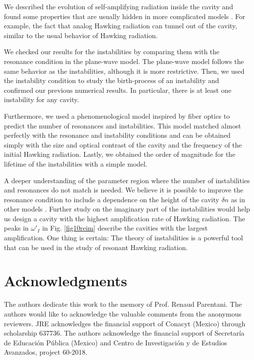 \documentclass[aps,pra,reprint,amsmath,amssymb,showpacs,groupedaddress,floatfix]{revtex4-1}
\begin{document}
We described the evolution of self-amplifying radiation inside the cavity and found some properties that are usually hidden in more complicated models \cite{GaonaReyes2017,Faccio2012}. For example, the fact that analog Hawking radiation can tunnel out of the cavity, similar to the usual behavior of Hawking radiation.

We checked our results for the instabilities by comparing them with the resonance condition in the plane-wave model. The plane-wave model follows the same behavior as the instabilities, although it is more restrictive. Then, we used the instability condition to study the birth-process of an instability and confirmed our previous numerical results. In particular, there is at least one instability for any cavity.

Furthermore, we used a phenomenological model inspired by fiber optics to predict the number of resonances and instabilities. This model matched almost perfectly with the resonance and instability conditions and can be obtained simply with the size and optical contrast of the cavity and the frequency of the initial Hawking radiation. Lastly, we obtained the order of magnitude for the lifetime of the instabilities with a simple model.

A deeper understanding of the parameter region where the number of instabilities and resonances do not match is needed. We believe it is possible to improve the resonance condition to include a dependence on the height of the cavity $\delta n$ as in other models \cite{michel2013saturation,GaonaReyes2017}. Further study on the imaginary part of the instabilities would help us design a cavity with the highest amplification rate of Hawking radiation. The peaks in $\omega'_I$ in Fig. \ref{fig10reim} describe the cavities with the largest amplification. One thing is certain: The theory of instabilities is a powerful tool that can be used in the study of resonant Hawking radiation.

\section*{Acknowledgments}
The authors dedicate this work to the memory of Prof. Renaud Parentani. The authors would like to acknowledge the valuable comments from the anonymous reviewers. JRE acknowledges the financial support of Conacyt (Mexico) through scholarship 637736. The authors acknowledge the financial support of Secretar\'ia de Educaci\'on P\'ublica (Mexico) and Centro de Investigación y de Estudios Avanzados, project 60-2018.


\end{document}
